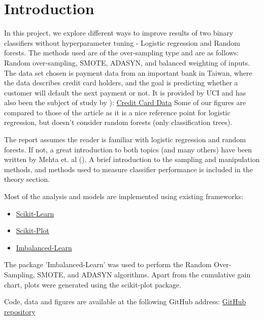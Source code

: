 \section{Introduction}
In this project, we explore different ways to improve results of two binary
classifiers without hyperparameter tuning - Logistic regression and
Random forests. The methods used are of the over-sampling type and are as
follows: Random over-sampling, SMOTE, ADASYN, and balanced weighting of
inputs.
The data set chosen is payment data from an important bank in Taiwan, 
where the data describes credit card holders, and the goal is predicting 
whether a customer will default the next payment or not.
It is provided by UCI and has also been the subject of study by \cite{ComparisonData}): 
\href{https://archive.ics.uci.edu/ml/datasets/default+of+credit+card+clients}{Credit Card Data}
Some of our figures are compared to those of the article as it is a nice
reference point for logistic regression, but doesn't consider random forests
(only classification trees).

The report assumes the reader is familiar with logistic regression and
random forests. If not, a great introduction to both topics (and many others)
have been written by Mehta et. al (\cite{mehta-article}).
A brief introduction to the sampling and manipulation methods, and methods
used to measure classifier performance is included in the theory section.

Most of the analysis and models are implemented using existing frameworks:
\begin{itemize}
\item \href{https://scikit-learn.org/}{Scikit-Learn}
\item \href{https://pypi.org/project/scikit-plot/0.3.7/}{Scikit-Plot}
\item \href{https://imbalanced-learn.org/en/stable/}{Imbalanced-Learn}
\end{itemize}
The package 'Imbalanced-Learn' was used to perform the Random Over-Sampling,
SMOTE, and ADASYN algorithms. Apart from the cumulative gain chart, 
plots were generated using the scikit-plot package.

Code, data and figures are available at the following GitHub address:
\href{https://github.com/geirtul/fys-stk4155/tree/master/project3}{GitHub repository}


